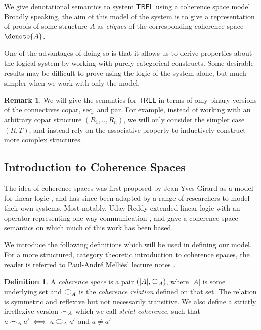 \documentclass[11pt, oneside]{article}
\theoremstyle{plain}
\theoremstyle{definition}
\newtheorem{definition}[theorem]{Definition}
\newtheorem*{remark}{Remark}
\DeclarePairedDelimiter\denote\llbracket\rrbracket
\newcommand{\sSys}{{\mathsf{TREL}}}%
\newcommand{\coh}[1][]{\mathrel{\vcenter{\offinterlineskip\hbox{$\frown$}\vskip0.2ex\hbox{$\smile$}}_{\ifx\\#1\\\else#1\fi}}}
\newcommand{\scoh}[1][]{\mathrel{\frown}_{\ifx\\#1\\\else#1\fi}}
\begin{document}
We give denotational semantics to system $\sSys$ using a coherence space model.
Broadly speaking, the aim of this model of the system is to give a representation of proofs of some structure $A$ as \textit{cliques} of the corresponding coherence space $\denote{A}$.

One of the advantages of doing so is that it allows us to derive properties about the logical system by working with purely categorical constructs.
Some desirable results may be difficult to prove using the logic of the system alone, but much simpler when we work with only the model.

\begin{remark}
We will give the semantics for $\sSys$ in terms of only binary versions of the connectives copar, seq, and par.
For example, instead of working with an arbitrary copar structure $(R_1,..,R_n)$, we will only consider the simpler case $(R,T)$, and instead rely on the associative property to inductively construct more complex structures.
\end{remark}

\subsection{Introduction to Coherence Spaces}
The idea of coherence spaces was first proposed by Jean-Yves Girard as a model for linear logic \cite{girard1987linear}, and has since been adapted by a range of researchers to model their own systems.
Most notably, Uday Reddy extended linear logic with an operator representing one-way communication \cite{reddy1993all}, and gave a coherence space semantics on which much of this work has been based.

We introduce the following definitions which will be used in defining our model.
For a more structured, category theoretic introduction to coherence spaces, the reader is referred to Paul-André Melliès' lecture notes \cite{mellies2000survival}.

\begin{definition}
    A \textit{coherence space} is a pair $(|A|,\coh[A])$, where $|A|$ is some underlying set and $\coh[A]$ is the \textit{coherence relation} defined on that set.
    The relation is symmetric and reflexive but not necessarily transitive.
    We also define a strictly irreflexive version $\scoh[A]$ which we call \textit{strict coherence}, such that $a\scoh[A]a' \iff a\coh[A]a'$ and $a\not=a'$
\end{definition}
\end{document}

